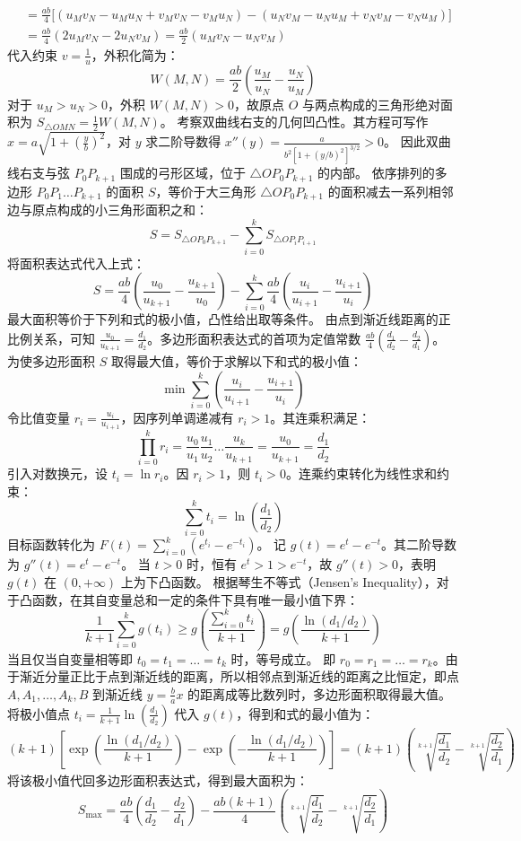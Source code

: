 \begin{solution}
\begin{align*}
&= \frac{ab}{4} \big[ (u_M v_N - u_M u_N + v_M v_N - v_M u_N) - (u_N v_M - u_N u_M + v_N v_M - v_N u_M) \big] \\
&= \frac{ab}{4} (2 u_M v_N - 2 u_N v_M) = \frac{ab}{2} (u_M v_N - u_N v_M)
\end{align*}
代入约束 $v = \frac{1}{u}$，外积化简为：
\[ W(M, N) = \frac{ab}{2} \left( \frac{u_M}{u_N} - \frac{u_N}{u_M} \right) \]
对于 $u_M > u_N > 0$，外积 $W(M, N) > 0$，故原点 $O$ 与两点构成的三角形绝对面积为 $S_{\triangle OMN} = \frac{1}{2} W(M, N)$。
考察双曲线右支的几何凹凸性。其方程可写作 $x = a\sqrt{1 + \left(\frac{y}{b}\right)^2}$，对 $y$ 求二阶导数得 $x''(y) = \frac{a}{b^2 \left[ 1 + (y/b)^2 \right]^{3/2}} > 0$。
因此双曲线右支与弦 $P_0 P_{k+1}$ 围成的弓形区域，位于 $\triangle O P_0 P_{k+1}$ 的内部。
依序排列的多边形 $P_0 P_1 \dots P_{k+1}$ 的面积 $S$，等价于大三角形 $\triangle O P_0 P_{k+1}$ 的面积减去一系列相邻边与原点构成的小三角形面积之和：
\[ S = S_{\triangle O P_0 P_{k+1}} - \sum_{i=0}^k S_{\triangle O P_i P_{i+1}} \]
将面积表达式代入上式：
\[ S = \frac{ab}{4} \left( \frac{u_0}{u_{k+1}} - \frac{u_{k+1}}{u_0} \right) - \sum_{i=0}^k \frac{ab}{4} \left( \frac{u_i}{u_{i+1}} - \frac{u_{i+1}}{u_i} \right) \]
最大面积等价于下列和式的极小值，凸性给出取等条件。
由点到渐近线距离的正比例关系，可知 $\frac{u_0}{u_{k+1}} = \frac{d_1}{d_2}$。多边形面积表达式的首项为定值常数 $\frac{ab}{4} \left( \frac{d_1}{d_2} - \frac{d_2}{d_1} \right)$。
为使多边形面积 $S$ 取得最大值，等价于求解以下和式的极小值：
\[ \min \sum_{i=0}^k \left( \frac{u_i}{u_{i+1}} - \frac{u_{i+1}}{u_i} \right) \]
令比值变量 $r_i = \frac{u_i}{u_{i+1}}$，因序列单调递减有 $r_i > 1$。其连乘积满足：
\[ \prod_{i=0}^k r_i = \frac{u_0}{u_1} \frac{u_1}{u_2} \dots \frac{u_k}{u_{k+1}} = \frac{u_0}{u_{k+1}} = \frac{d_1}{d_2} \]
引入对数换元，设 $t_i = \ln r_i$。因 $r_i > 1$，则 $t_i > 0$。连乘约束转化为线性求和约束：
\[ \sum_{i=0}^k t_i = \ln\left(\frac{d_1}{d_2}\right) \]
目标函数转化为 $F(t) = \sum_{i=0}^k (e^{t_i} - e^{-t_i})$。
记 $g(t) = e^t - e^{-t}$。其二阶导数为 $g''(t) = e^t - e^{-t}$。
当 $t > 0$ 时，恒有 $e^t > 1 > e^{-t}$，故 $g''(t) > 0$，表明 $g(t)$ 在 $(0, +\infty)$ 上为下凸函数。
根据琴生不等式（Jensen's Inequality），对于凸函数，在其自变量总和一定的条件下具有唯一最小值下界：
\[ \frac{1}{k+1} \sum_{i=0}^k g(t_i) \ge g\left( \frac{\sum_{i=0}^k t_i}{k+1} \right) = g\left( \frac{\ln(d_1/d_2)}{k+1} \right) \]
当且仅当自变量相等即 $t_0 = t_1 = \dots = t_k$ 时，等号成立。
即 $r_0 = r_1 = \dots = r_k$。由于渐近分量正比于点到渐近线的距离，所以相邻点到渐近线的距离之比恒定，即点 $A, A_1, \dots, A_k, B$ 到渐近线 $y=\frac{b}{a}x$ 的距离成等比数列时，多边形面积取得最大值。
将极小值点 $t_i = \frac{1}{k+1} \ln\left(\frac{d_1}{d_2}\right)$ 代入 $g(t)$，得到和式的最小值为：
\[ (k+1) \left[ \exp\left( \frac{\ln(d_1/d_2)}{k+1} \right) - \exp\left( -\frac{\ln(d_1/d_2)}{k+1} \right) \right] = (k+1) \left( \sqrt[k+1]{\frac{d_1}{d_2}} - \sqrt[k+1]{\frac{d_2}{d_1}} \right) \]
将该极小值代回多边形面积表达式，得到最大面积为：
\[ S_{\max} = \frac{ab}{4}\left(\frac{d_1}{d_2}-\frac{d_2}{d_1}\right) - \frac{ab(k+1)}{4}\left(\sqrt[k+1]{\frac{d_1}{d_2}}-\sqrt[k+1]{\frac{d_2}{d_1}}\right) \]

\end{solution}


